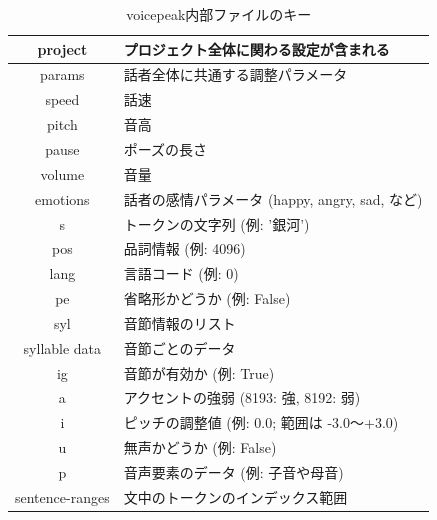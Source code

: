 \begin{table}[htb]
    \centering
    \caption{voicepeak内部ファイルのキー}
    \begin{tabular}{c|l}\hline
        project         & プロジェクト全体に関わる設定が含まれる                   \\ \hline
        params          & 話者全体に共通する調整パラメータ                      \\
        speed           & 話速                                    \\
        pitch           & 音高                                    \\
        pause           & ポーズの長さ                                \\
        volume          & 音量                                    \\
        emotions        & 話者の感情パラメータ \scriptsize{(happy, angry, sad, など)} \\
        s               & トークンの文字列 (例: '銀河')                    \\
        pos             & 品詞情報 (例: 4096)                        \\
        lang            & 言語コード (例: 0)                          \\
        pe              & 省略形かどうか (例: False)                    \\
        syl             & 音節情報のリスト                              \\
        syllable data   & 音節ごとのデータ                              \\
        ig              & 音節が有効か (例: True)                      \\
        a               & アクセントの強弱 (8193: 強, 8192: 弱)           \\
        i               & ピッチの調整値 (例: 0.0; 範囲は -3.0～+3.0)       \\
        u               & 無声かどうか (例: False)                     \\
        p               & 音声要素のデータ (例: 子音や母音)                   \\
        sentence-ranges & 文中のトークンのインデックス範囲                      \\ \hline
    \end{tabular}
    \label{voipi}
\end{table}



